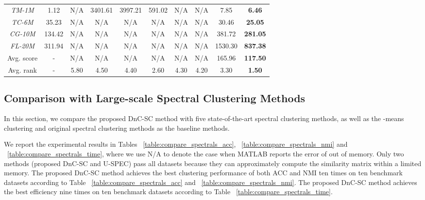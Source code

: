 \begin{table*}[]
{\begin{tabular}{@{}c||c||ccccccc|c@{}}
      \emph{TM-1M    }  & 1.12     & N/A                & 3401.61 & 3997.21 & 591.02      & N/A                 & N/A                 & 7.85       & \textbf{6.46}     \\
      \emph{TC-6M    }  & 35.23    & N/A                & N/A                    & N/A                     & N/A                        & N/A                 & N/A                 & 30.46      & \textbf{25.05}    \\
      \emph{CG-10M    } & 134.42   & N/A                & N/A                    & N/A                     & N/A                        & N/A                 & N/A                 & 381.72    & \textbf{281.05}  \\
      \emph{FL-20M}     & 311.94   & N/A                & N/A                    & N/A                     & N/A                        & N/A                 & N/A                 & 1530.30  & \textbf{837.38} \\
      \midrule
      \midrule
      Avg. score        & \multicolumn{1}{c}{-} & N/A                & N/A                    & N/A                     & N/A                        & N/A                 & N/A                 & 165.96                  & \textbf{117.50}                \\
      \midrule
      \midrule
      Avg. rank         & \multicolumn{1}{c}{-} & 5.80               & 4.50                   & 4.40                    & 2.60                       & 4.30                & 4.20                & 3.30                    & \textbf{1.50 }                 \\
      \bottomrule
    \end{tabular}}
\end{table*}

\subsection{Comparison with Large-scale Spectral Clustering Methods}
\label{sec:cmp_spectral}


In this section, we compare the proposed DnC-SC method with five state-of-the-art spectral clustering methods, as well as the -means clustering and original spectral clustering methods as the baseline methods.

We report the experimental results in Tables ~\ref{table:compare_spectrals_acc}, ~\ref{table:compare_spectrals_nmi} and ~\ref{table:compare_spectrals_time}, where we use N/A to denote the case when MATLAB reports the error of out of memory.
Only two methods (proposed DnC-SC and U-SPEC) pass all datasets because they can approximately compute the similarity matrix within a limited memory.
The proposed DnC-SC method achieves the best clustering performance of both ACC and NMI ten times on ten benchmark datasets according to Table ~\ref{table:compare_spectrals_acc} and ~\ref{table:compare_spectrals_nmi}.
The proposed DnC-SC method achieves the best efficiency nine times on ten benchmark datasets according to Table ~\ref{table:compare_spectrals_time}.

